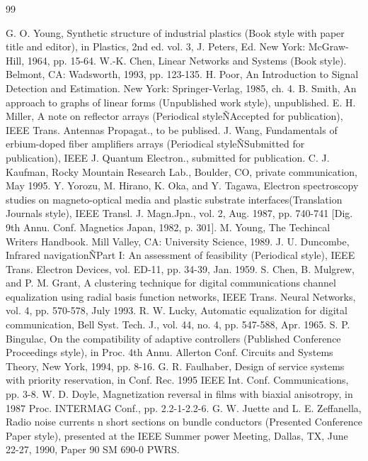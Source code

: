 \documentclass[letterpaper, 10 pt, conference]{ieeeconf}  %
\begin{document}
\begin{thebibliography}{99}

 G. O. Young, Synthetic structure of industrial plastics (Book style with paper title and editor), 	in Plastics, 2nd ed. vol. 3, J. Peters, Ed.  New York: McGraw-Hill, 1964, pp. 15-64.
 W.-K. Chen, Linear Networks and Systems (Book style).	Belmont, CA: Wadsworth, 1993, pp. 123-135.
 H. Poor, An Introduction to Signal Detection and Estimation.   New York: Springer-Verlag, 1985, ch. 4.
 B. Smith, An approach to graphs of linear forms (Unpublished work style), unpublished.
 E. H. Miller, A note on reflector arrays (Periodical styleÑAccepted for publication), IEEE Trans. Antennas Propagat., to be publised.
 J. Wang, Fundamentals of erbium-doped fiber amplifiers arrays (Periodical styleÑSubmitted for publication), IEEE J. Quantum Electron., submitted for publication.
 C. J. Kaufman, Rocky Mountain Research Lab., Boulder, CO, private communication, May 1995.
 Y. Yorozu, M. Hirano, K. Oka, and Y. Tagawa, Electron spectroscopy studies on magneto-optical media and plastic substrate interfaces(Translation Journals style), IEEE Transl. J. Magn.Jpn., vol. 2, Aug. 1987, pp. 740-741 [Dig. 9th Annu. Conf. Magnetics Japan, 1982, p. 301].
 M. Young, The Techincal Writers Handbook.  Mill Valley, CA: University Science, 1989.
 J. U. Duncombe, Infrared navigationÑPart I: An assessment of feasibility (Periodical style), IEEE Trans. Electron Devices, vol. ED-11, pp. 34-39, Jan. 1959.
 S. Chen, B. Mulgrew, and P. M. Grant, A clustering technique for digital communications channel equalization using radial basis function networks, IEEE Trans. Neural Networks, vol. 4, pp. 570-578, July 1993.
 R. W. Lucky, Automatic equalization for digital communication, Bell Syst. Tech. J., vol. 44, no. 4, pp. 547-588, Apr. 1965.
 S. P. Bingulac, On the compatibility of adaptive controllers (Published Conference Proceedings style), in Proc. 4th Annu. Allerton Conf. Circuits and Systems Theory, New York, 1994, pp. 8-16.
 G. R. Faulhaber, Design of service systems with priority reservation, in Conf. Rec. 1995 IEEE Int. Conf. Communications, pp. 3-8.
 W. D. Doyle, Magnetization reversal in films with biaxial anisotropy, in 1987 Proc. INTERMAG Conf., pp. 2.2-1-2.2-6.
 G. W. Juette and L. E. Zeffanella, Radio noise currents n short sections on bundle conductors (Presented Conference Paper style), presented at the IEEE Summer power Meeting, Dallas, TX, June 22-27, 1990, Paper 90 SM 690-0 PWRS.

\end{thebibliography}
\end{document}
